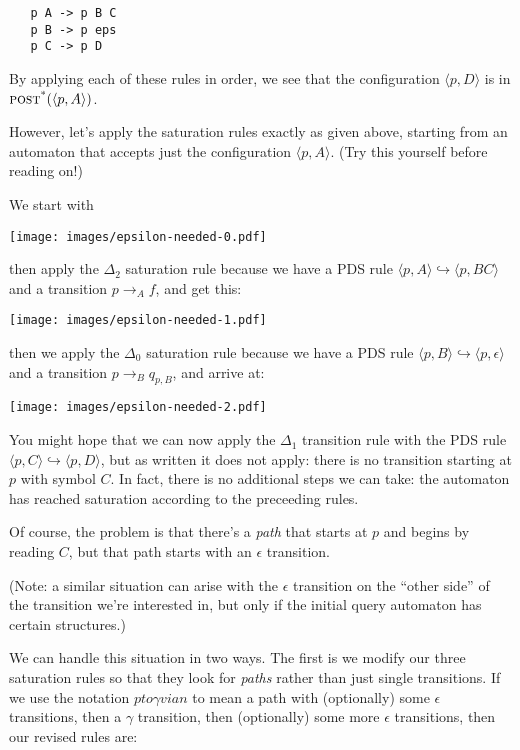 \documentclass{article}
\newcommand{\Config}[2]{\ensuremath{\langle #1, #2 \rangle}}
\newcommand{\Rule}[2]{\ensuremath{#1 \hookrightarrow #2}}
\newcommand{\Trans}[3]{\ensuremath{#1 \rightarrow_{#2} #3}}
\newcommand{\epspath}[3]{\ensuremath{#1 to #2 via #3}}
\newcommand{\poststar}{\ensuremath{\textsc{post}^\textsc{*}}}
\begin{document}
\begin{verbatim}
   p A -> p B C
   p B -> p eps
   p C -> p D
\end{verbatim}

By applying each of these rules in order, we see that the
configuration \Config{p}{D} is in $\poststar(\Config{p}{A})$.

However, let's apply the saturation rules exactly as given above,
starting from an automaton that accepts just the configuration
\Config{p}{A}. (Try this yourself before reading on!)

We start with
\begin{center}
  \texttt{[image: images/epsilon-needed-0.pdf]}
\end{center}

then apply the $\Delta_2$ saturation rule because we have a PDS rule
\Rule{\Config{p}{A}}{\Config{p}{B C}} and a transition \Trans{p}{A}{f},
and get this:
\begin{center}
  \texttt{[image: images/epsilon-needed-1.pdf]}
\end{center}

then we apply the $\Delta_0$ saturation rule because we have a PDS
rule \Rule{\Config{p}{B}}{\Config{p}{\epsilon}} and a transition
\Trans{p}{B}{q_{p,B}}, and arrive at:
\begin{center}
  \texttt{[image: images/epsilon-needed-2.pdf]}
\end{center}

You might hope that we can now apply the $\Delta_1$ transition rule
with the PDS rule \Rule{\Config{p}{C}}{\Config{p}{D}}, but as written
it does not apply: there is no transition starting at $p$ with symbol
$C$. In fact, there is no additional steps we can take: the automaton
has reached saturation according to the preceeding rules.

Of course, the problem is that there's a \emph{path} that starts at
$p$ and begins by reading $C$, but that path starts with an $\epsilon$
transition.

(Note: a similar situation can arise with the $\epsilon$ transition on
the ``other side'' of the transition we're interested in, but only if
the initial query automaton has certain structures.)

We can handle this situation in two ways. The first is we modify our
three saturation rules so that they look for \emph{paths} rather than
just single transitions. If we use the notation \epspath{p}{\gamma}{n}
to mean a path with (optionally) some $\epsilon$ transitions, then a
$\gamma$ transition, then (optionally) some more $\epsilon$ transitions,
then our revised rules are:
\end{document}
